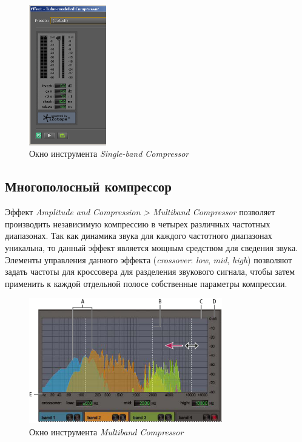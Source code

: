 \documentclass[oneside, final, 14pt]{extreport}
\begin{document}
\begin{figure}[h!]
  \centering
  \includegraphics[width=0.3\textwidth]{pic-tubemode-01}
  \caption{Окно инструмента \emph{Single-band Compressor}}
  \label{pic-tubemode-01}
\end{figure}

\subsection{Многополосный компрессор}
Эффект \emph{Amplitude and Compression > Multiband Compressor} позволяет производить независимую компрессию в четырех различных частотных диапазонах. Так как динамика звука для каждого частотного диапазонах уникальна, то данный эффект является мощным средством для сведения звука. Элементы управления данного эффекта (\emph{crossover}: \emph{low}, \emph{mid}, \emph{high}) позволяют задать частоты для кроссовера для разделения звукового сигнала, чтобы затем применить к каждой отдельной полосе собственные параметры компрессии.

\begin{figure}[h!]
  \centering
  \includegraphics[width=0.75\textwidth]{pic-multiband-01}
  \caption{Окно инструмента \emph{Multiband Compressor}}
  \label{pic-muliband-01}
\end{figure}
\end{document}
